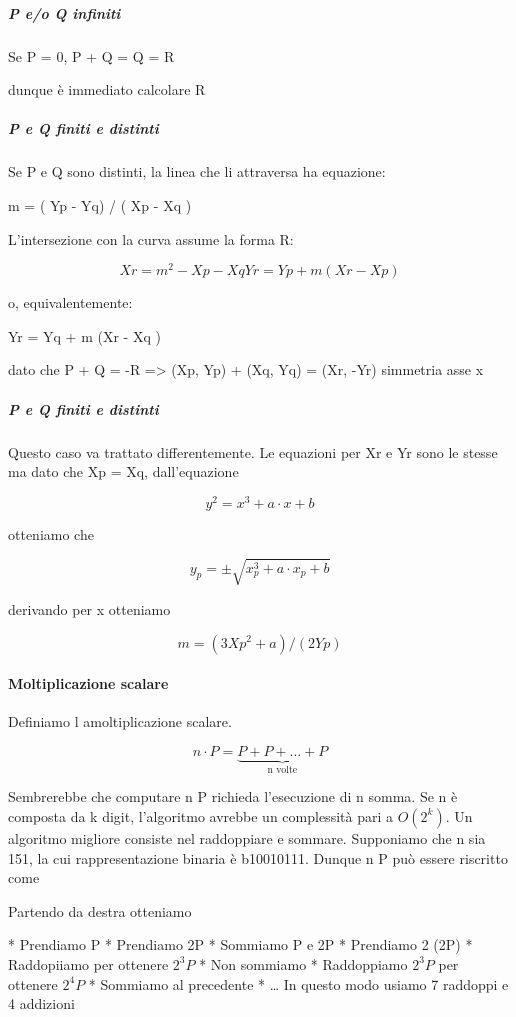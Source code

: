 \documentclass{book}
\theoremstyle{definition}
\begin{document}
\subparagraph{P e/o Q infiniti}

Se P = 0, P + Q = Q = R

dunque è immediato calcolare R

\subparagraph{P e Q finiti e distinti}

Se P e Q sono distinti, la linea che li attraversa ha equazione:

m = ( Yp - Yq) / ( Xp - Xq )

L'intersezione con la curva assume la forma R:

\[
    Xr = m^{2} - Xp - Xq
    Yr = Yp + m ( Xr - Xp )
\]

o, equivalentemente:

Yr = Yq + m (Xr - Xq )

dato che P + Q = -R => (Xp, Yp) + (Xq, Yq) = (Xr, -Yr) simmetria asse x

\subparagraph{P e Q finiti e distinti}

Questo caso va trattato differentemente. Le equazioni per Xr e Yr sono le stesse ma dato che Xp = Xq, dall'equazione

\[
    y^{2} = x^{3} + a \cdot x + b
\]

otteniamo che

\[
    y_{p} = \pm \sqrt{x_{p}^{3} + a \cdot x_{p} + b}
\]

derivando per x otteniamo

\[
    m = ( 3 Xp^{2} + a ) / ( 2 Yp )
\]

\paragraph{Moltiplicazione scalare}

Definiamo l amoltiplicazione scalare.

\[
n \cdot P = \underbrace{P + P + \dots + P}_\text{n volte}
\]

Sembrerebbe che computare n P richieda l'esecuzione di n somma. Se n è composta da k digit, l'algoritmo avrebbe un complessità pari a $O(2^{k})$.
Un algoritmo migliore consiste nel raddoppiare e sommare. Supponiamo che n sia 151, la cui rappresentazione binaria è b10010111.
Dunque n P può essere riscritto come


Partendo da destra otteniamo

* Prendiamo P
* Prendiamo 2P
* Sommiamo P e 2P
* Prendiamo 2 (2P)
* Raddopiiamo per ottenere $2^{3}P$
* Non sommiamo
* Raddoppiamo $2^{3}P$ per ottenere $2^{4}P$
* Sommiamo al precedente
* \dots
In questo modo usiamo 7 raddoppi e 4 addizioni
\end{document}
